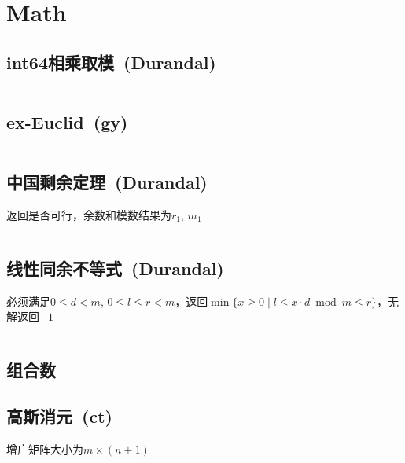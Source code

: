 \chapter{Math}
\section{int64相乘取模\ \small(Durandal)}
	\inputminted{cpp}{Math/int64_multiply_mod.cpp}
\section{ex-Euclid\ \small(gy)}
	\inputminted{cpp}{Math/extend_gcd.cpp}
\section{中国剩余定理\ \small(Durandal)}
	返回是否可行，余数和模数结果为$ r_1 $, $ m_1 $
	\inputminted{cpp}{Math/chinese_remainder_theorem.cpp}
\section{线性同余不等式\ \small(Durandal)}
	必须满足$ 0 \leq d < m $, $ 0 \leq l \leq r < m $，返回$ \min\lbrace x \geq 0 \mid l \leq x \cdot d \bmod m \leq r \rbrace $，无解返回$ -1 $ 
	\inputminted{cpp}{Math/linear_congruence_inequality.cpp}
\section{组合数}
\section{高斯消元\ \small(ct)}
	增广矩阵大小为$ m \times (n + 1) $
	\inputminted{cpp}{Math/gauss_elimination.cpp}
